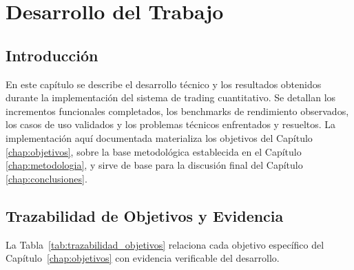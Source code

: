 \chapter{Desarrollo del Trabajo}
\label{chap:desarrollo}

\section{Introducción}

En este capítulo se describe el desarrollo técnico y los resultados obtenidos durante la implementación del sistema de trading cuantitativo. Se detallan los incrementos funcionales completados, los benchmarks de rendimiento observados, los casos de uso validados y los problemas técnicos enfrentados y resueltos. La implementación aquí documentada materializa los objetivos del Capítulo \ref{chap:objetivos}, sobre la base metodológica establecida en el Capítulo \ref{chap:metodologia}, y sirve de base para la discusión final del Capítulo \ref{chap:conclusiones}.

\section{Trazabilidad de Objetivos y Evidencia}

La Tabla~\ref{tab:trazabilidad_objetivos} relaciona cada objetivo específico del Capítulo~\ref{chap:objetivos} con evidencia verificable del desarrollo.

